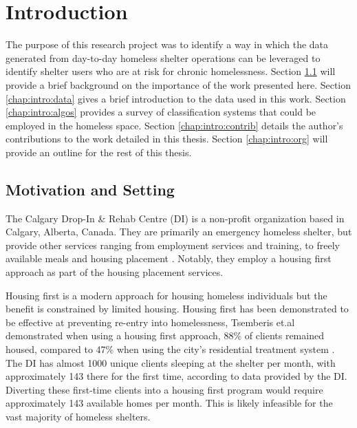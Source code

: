 \chapter{Introduction} \label{chap:intro}

The purpose of this research project was to identify a way in which the data generated from day-to-day homeless shelter operations can be leveraged to identify shelter users who are at risk for chronic homelessness. 
Section \ref{chap:intro:motivation} will provide a brief background on the importance of the work presented here.
Section \ref{chap:intro:data} gives a brief introduction to the data used in this work.
Section \ref{chap:intro:algos} provides a survey of classification systems that could be employed in the homeless space.
Section \ref{chap:intro:contrib} details the author's contributions to the work detailed in this thesis.
Section \ref{chap:intro:org} will provide an outline for the rest of this thesis.

\section{Motivation and Setting} \label{chap:intro:motivation}


The Calgary Drop-In \& Rehab Centre (DI) is a non-profit organization based in  Calgary, Alberta, Canada. They are primarily an emergency homeless shelter, but provide other services ranging from employment services and training, to freely available meals and housing placement \cite{di_2020}. Notably, they employ a housing first\cite{athome2014chezsoi} approach as part of the housing placement services.

Housing first is a modern approach for housing homeless individuals but the benefit is constrained by limited housing. Housing first has been demonstrated to be effective at preventing re-entry into homelessness, Tsemberis et.al demonstrated when using a housing first approach, 88\% of clients remained housed, compared to 47\% when using the city's residential treatment system \cite{tsemberis2000housingfirst}.
The DI has almost 1000 unique clients sleeping at the shelter per month, with approximately 143 there for the first time, according to data provided by the DI. Diverting these first-time clients into a housing first program would require approximately 143 available homes per month. This is likely infeasible for the vast majority of homeless shelters.

